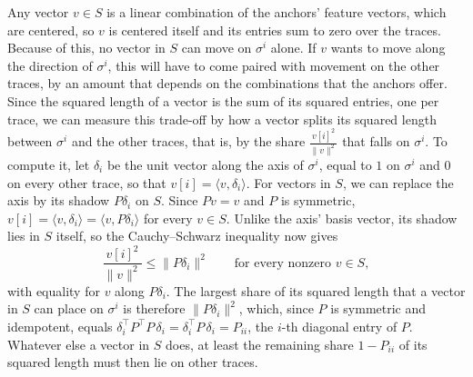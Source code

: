 \documentclass[titlepage,a4paper,11pt]{report}
\begin{document}
    Any vector $v\in S$ is a linear combination of the anchors' feature vectors, which are centered, so $v$ is centered itself and its entries sum to zero over the traces. Because of this, no vector in $S$ can move on $\sigma^i$ alone. If $v$ wants to move along the direction of $\sigma^i$, this will have to come paired with movement on the other traces, by an amount that depends on the combinations that the anchors offer. Since the squared length of a vector is the sum of its squared entries, one per trace, we can measure this trade-off by how a vector splits its squared length between $\sigma^i$ and the other traces, that is, by the share $\frac{v[i]^2}{\lVert v\rVert^2}$ that falls on $\sigma^i$. To compute it, let $\delta_i$ be the unit vector along the axis of $\sigma^i$, equal to $1$ on $\sigma^i$ and $0$ on every other trace, so that $v[i]=\langle v,\delta_i\rangle$. For vectors in $S$, we can replace the axis by its shadow $P\delta_i$ on $S$. Since $Pv=v$ and $P$ is symmetric, $v[i]=\langle v,\delta_i\rangle=\langle v,P\delta_i\rangle$ for every $v\in S$. Unlike the axis' basis vector, its shadow lies in $S$ itself, so the Cauchy--Schwarz inequality now gives
    \begin{equation}\label{eq:share_bound}
        \frac{v[i]^2}{\lVert v\rVert^2}\le\lVert P\delta_i\rVert^2 \qquad\text{for every nonzero } v\in S,
    \end{equation}
    with equality for $v$ along $P\delta_i$. The largest share of its squared length that a vector in $S$ can place on $\sigma^i$ is therefore $\lVert P\delta_i\rVert^2$, which, since $P$ is symmetric and idempotent, equals $\delta_i^\top P^\top P\,\delta_i=\delta_i^\top P\,\delta_i=P_{ii}$, the $i$-th diagonal entry of $P$. Whatever else a vector in $S$ does, at least the remaining share $1-P_{ii}$ of its squared length must then lie on other traces.
    
\end{document}

